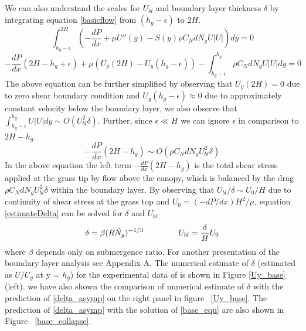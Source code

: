 \documentclass[12pt]{report}   %
\newcommand{\Ndg}{\tilde{N}_g}
\begin{document}
We can also understand the scales for $U_{bl}$ and boundary layer thickness $\delta$ by integrating equation \eqref{basicflow} from $(h_g-\epsilon)$ to $2H$.
\begin{equation}
 \int_{h_g - \epsilon}^{2H} \left( -\frac{dP}{dx}+\mu U''(y) -S(y) \rho C_N d N_gU |U|\right)dy = 0 
\end{equation}
\begin{equation*}
-\frac{dP}{dx}(2H-h_g+\epsilon)+\mu (U_y(2H)-U_y(h_g-\epsilon)) -\int_{h_g-\epsilon}^{h_g} \rho C_N d N_gU |U|dy  =0
\end{equation*}
The above equation can be further simplified by observing that $U_y(2H)=0$ due to zero shear boundary condition and $U_y(h_g-\epsilon) \approx 0$ due to approximately constant velocity below the boundary layer, we also observe that $\int_{h_g-\epsilon}^{h_g} U |U| dy \sim O( U_{bl}^2 \delta )$.
Further, since $\epsilon \ll H$ we can ignore $\epsilon$ in comparison to $2H-h_g$.
\begin{equation}
-\frac{dP}{dx}(2H-h_g) \sim O( \rho C_N d N_g U_{bl}^2  \delta )
\label{estimateDelta}
\end{equation}
In the above equation the left term $ -\frac{dP}{dx}(2H-h_g)$ is the total shear stress applied at the grass tip by flow above the canopy, which is balanced by the drag $\rho C_N d N_g U_{bl}^2 \delta $ within the boundary layer. By observing that $ U_{bl}/\delta \sim U_0/H$ due to continuity of shear stress at the grass top and $U_0 = (-dP/dx) H^2/\mu$, equation \eqref{estimateDelta} can be solved for $\delta$ and $U_{bl}$
\begin{equation}
 \delta = \beta (R\Ndg)^{-1/3} \hspace{1.5cm} U_{bl} = \frac{\delta}{H} U_0 
 \label{delta_asymp}
\end{equation}
where $\beta$ depends only on submergence ratio. For another presentation of the boundary layer analysis see Appendix A. The numerical estimate of $\delta$ (estimated as $U/U_y$ at y = $h_g$) for the experimental data of \cite{Nepf04} is shown in Figure \ref{Uy_base} (left). we have also shown the comparison of numerical estimate of $\delta$ with the prediction of \eqref{delta_asymp} on the right panel in figure ~\ref{Uy_base}.
The prediction of \eqref{delta_asymp} with the solution of \eqref{base_equ} are also shown in Figure ~\ref{base_collapse}. 
\end{document}
